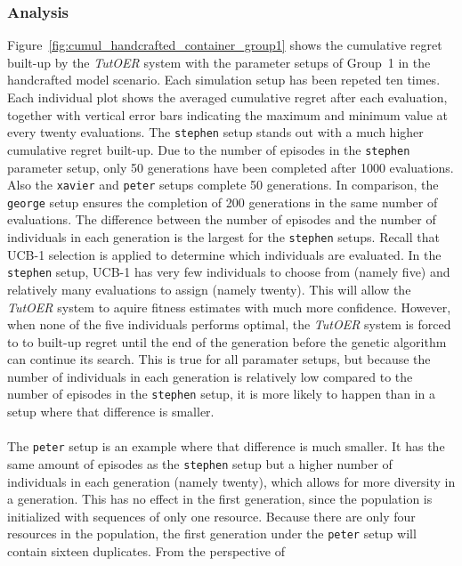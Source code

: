 \subsubsection*{Analysis}
Figure~\ref{fig:cumul_handcrafted_container_group1} shows the cumulative
regret built-up by the \emph{TutOER} system with the parameter setups of Group~1
in the handcrafted model scenario. Each simulation setup has
been repeted ten times. Each individual plot shows the averaged cumulative
regret after each evaluation, together with vertical error bars indicating the
maximum and minimum value at every twenty evaluations. The \texttt{stephen} setup stands out with a
much higher cumulative regret built-up. Due to the number of episodes in the
\texttt{stephen} parameter setup, only 50 generations have been completed after
1000 evaluations. Also the \texttt{xavier} and \texttt{peter} setups complete
50 generations. In comparison, the \texttt{george} setup ensures the completion
of 200 generations in the same number of evaluations. The difference between
the number of episodes and the number of individuals in each generation is the
largest for the \texttt{stephen} setups. Recall that UCB-1 selection is applied
to determine which individuals are evaluated. In the \texttt{stephen} setup,
UCB-1 has very few individuals to choose from (namely five) and relatively many
evaluations to assign (namely twenty). This will allow the \emph{TutOER} system
to aquire fitness estimates with much more confidence. However, when none of
the five individuals performs optimal, the \emph{TutOER} system is forced to
to built-up regret until the end of the generation before the genetic algorithm
can continue its search. This is true for all paramater setups, but
because the number of individuals in each generation is relatively low compared
to the number of episodes in the \texttt{stephen} setup, it is more likely to
happen than in a setup where that difference is smaller.\\\\
\noindent
The \texttt{peter}
setup is an example where that difference is much smaller. It has the same
amount of episodes as the \texttt{stephen} setup but a higher number of
individuals in each generation (namely twenty), which allows for more diversity in a
generation. This has no effect in the first generation, since the
population is initialized with sequences of only one resource. Because there are
only four resources in the population, the first generation under the
\texttt{peter} setup will contain sixteen duplicates. From the perspective of
